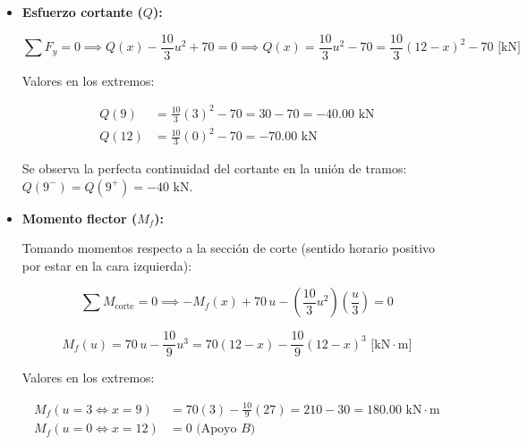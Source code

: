 \begin{itemize}

    \item \textbf{Esfuerzo cortante ($Q$):}

          \begin{equation}

              \sum F_y = 0 \implies Q(x) - \frac{10}{3}u^2 + 70 = 0 \implies Q(x) = \frac{10}{3}u^2 - 70 = \boxed{\frac{10}{3}(12 - x)^2 - 70\text{ [kN]}}

          \end{equation}

          Valores en los extremos:

          \begin{align*}

              Q(9)  & = \frac{10}{3}(3)^2 - 70 = 30 - 70 = -40.00\text{ kN} \\

              Q(12) & = \frac{10}{3}(0)^2 - 70 = -70.00\text{ kN}

          \end{align*}

          Se observa la perfecta continuidad del cortante en la unión de tramos: $Q(9^-) = Q(9^+) = -40\text{ kN}$.



    \item \textbf{Momento flector ($M_f$):}

          Tomando momentos respecto a la sección de corte (sentido horario positivo por estar en la cara izquierda):

          \begin{equation}

              \sum M_{\text{corte}} = 0 \implies -M_f(x) + 70\,u - \left(\frac{10}{3}u^2\right)\left(\frac{u}{3}\right) = 0

          \end{equation}

          \begin{equation}

              \boxed{M_f(u) = 70\,u - \frac{10}{9}u^3 = 70(12 - x) - \frac{10}{9}(12 - x)^3\text{ [kN}\cdot\text{m]}}

          \end{equation}

          Valores en los extremos:

          \begin{align*}

              M_f(u=3 \iff x=9)  & = 70(3) - \frac{10}{9}(27) = 210 - 30 = 180.00\text{ kN}\cdot\text{m} \\

              M_f(u=0 \iff x=12) & = 0\text{ (Apoyo } B)

          \end{align*}

\end{itemize}



